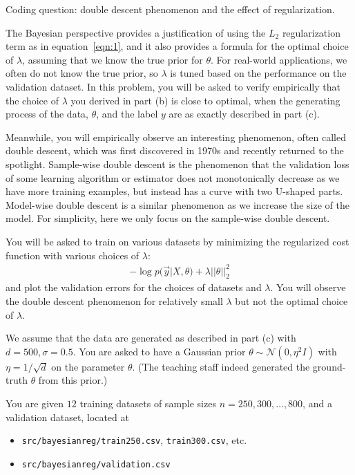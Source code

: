\item {} Coding question:  double descent phenomenon and the effect of regularization. 

The Bayesian perspective provides a justification of using the $L_2$ regularization term as in equation~\eqref{eqn:1}, and it also provides a formula for the optimal choice of $\lambda$, assuming that we know the true prior for $\theta$. For real-world applications, we often do not know the true prior, so $\lambda$ is tuned based on the performance on the validation dataset. In this problem, you will be asked to verify empirically that  the choice of $\lambda$ you derived in part (b) is close to optimal, when the generating process of the data, $\theta$, and the label $y$ are as exactly described in part (c). 

Meanwhile, you will empirically observe an interesting phenomenon, often called double descent, which was first discovered in 1970s and recently returned to the spotlight. Sample-wise double descent is the phenomenon that the validation loss of some learning algorithm or estimator does not monotonically decrease as we have more training examples, but instead has a curve with two U-shaped parts. Model-wise double descent is a similar phenomenon as we increase the size of the model. For simplicity, here we only focus on the sample-wise double descent.  

You will be asked to train on various datasets by minimizing the regularized cost function with various choices of $\lambda$: 
\begin{align}
- \log p(\vec{y}|X,\theta) + \lambda||\theta||^2_2 \label{eqn:3}
\end{align}
and plot the validation errors for the choices of datasets and $\lambda$. You will observe the double descent phenomenon for relatively small $\lambda$ but not the optimal choice of $\lambda.$

 We assume that the data are generated as described in part (c) with $d=500, \sigma=0.5$. You are asked to have a Gaussian prior $\theta \sim \mathcal{N}(0,\eta^2 I)$ with $\eta=1/\sqrt{d}$ on the parameter $\theta$. (The teaching staff indeed generated the ground-truth $\theta$ from this prior.) 

You are given $12$ training datasets of sample sizes $n  = 250, 300, \dots, 800$, and a validation dataset, located at
\begin{itemize}
	\item \texttt{src/bayesianreg/train250.csv}, \texttt{train300.csv}, etc.
	\item \texttt{src/bayesianreg/validation.csv}
\end{itemize} 

